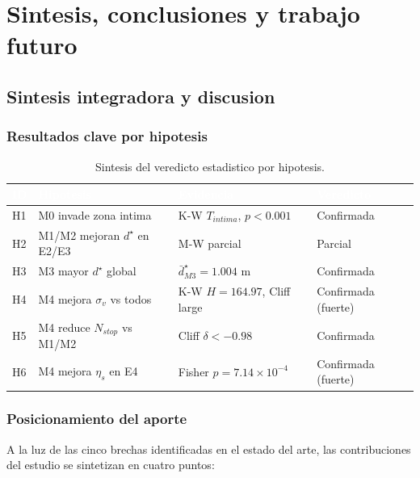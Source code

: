 \documentclass[12pt,a4paper,oneside]{book}
\begin{document}
\part{Sintesis, conclusiones y trabajo futuro}

\chapter{Sintesis integradora y discusion}
\label{chap:sintesis}

\section{Resultados clave por hipotesis}

\begin{table}[H]
\centering
\caption{Sintesis del veredicto estadistico por hipotesis.}
\renewcommand{\arraystretch}{1.4}
\small
\begin{tabular}{lp{4cm}p{4cm}l}
\toprule
\rowcolor{primary}
\textcolor{white}{\textbf{ID}} & \textcolor{white}{\textbf{Hipotesis}} & \textcolor{white}{\textbf{Evidencia}} & \textcolor{white}{\textbf{Veredicto}} \\
\midrule
H1 & M0 invade zona intima & K-W $T_{intima}$, $p<0.001$ & Confirmada \\
H2 & M1/M2 mejoran $d^\star$ en E2/E3 & M-W parcial & Parcial \\
H3 & M3 mayor $d^\star$ global & $\bar{d}^\star_{M3}=1.004$ m & Confirmada \\
H4 & M4 mejora $\sigma_v$ vs todos & K-W $H=164.97$, Cliff large & Confirmada (fuerte) \\
H5 & M4 reduce $N_{stop}$ vs M1/M2 & Cliff $\delta < -0.98$ & Confirmada \\
H6 & M4 mejora $\eta_s$ en E4 & Fisher $p=7.14\times 10^{-4}$ & Confirmada (fuerte) \\
\bottomrule
\end{tabular}
\end{table}

\section{Posicionamiento del aporte}

A la luz de las cinco brechas identificadas en el estado del arte, las contribuciones del estudio se sintetizan en cuatro puntos:
\end{document}
